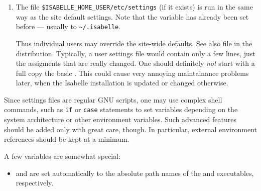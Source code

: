 \begin{isabellebody}
\begin{isamarkuptext}
\begin{enumerate}
  \item The file \verb|$ISABELLE_HOME_USER/etc/settings| (if it
  exists) is run in the same way as the site default settings. Note
  that the variable \hyperlink{setting.ISABELLE-HOME-USER}{\mbox{}} has already been set
  before --- usually to \verb|~/.isabelle|.
  
  Thus individual users may override the site-wide defaults.  See also
  file \hyperlink{file.$ISABELLE-HOME/etc/user-settings.sample}{\mbox{}} in the
  distribution.  Typically, a user settings file would contain only a
  few lines, just the assigments that are really changed.  One should
  definitely \emph{not} start with a full copy the basic \hyperlink{file.$ISABELLE-HOME/etc/settings}{\mbox{}}. This could cause very annoying
  maintainance problems later, when the Isabelle installation is
  updated or changed otherwise.
  
  \end{enumerate}

  Since settings files are regular GNU \hypertarget{executable.bash}{\hyperlink{executable.bash}{\mbox{}}} scripts,
  one may use complex shell commands, such as \verb|if| or
  \verb|case| statements to set variables depending on the
  system architecture or other environment variables.  Such advanced
  features should be added only with great care, though. In
  particular, external environment references should be kept at a
  minimum.

  \medskip A few variables are somewhat special:

  \begin{itemize}

  \item {}\hypertarget{setting.ISABELLE-PROCESS}{\hyperlink{setting.ISABELLE-PROCESS}{\mbox{}}} and \hypertarget{setting.ISABELLE-TOOL}{\hyperlink{setting.ISABELLE-TOOL}{\mbox{}}} are set
  automatically to the absolute path names of the \hyperlink{executable.isabelle-process}{\mbox{}} and \hyperlink{executable.isabelle}{\mbox{}} executables,
  respectively.
  

\end{itemize}
\end{isamarkuptext}
\end{isabellebody}
